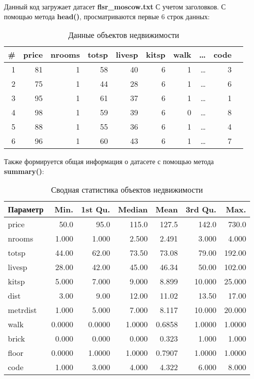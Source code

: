 Данный код загружает датасет \textbf{flsr\_moscow.txt} С учетом заголовков.
С помощью метода \textbf{head()}, просматриваются первые 6 строк данных:
\begin{table}
	\centering
	\caption{Данные объектов недвижимости}
	\begin{tabular}{@{}rrrrrrrrrr@{}}
		\toprule
		\# & price & nrooms & totsp & livesp & kitsp  & walk & \dots  & code \\ \midrule
		1  & 81    & 1      & 58    & 40     & 6            & 1    & \dots     & 3    \\
		2  & 75    & 1      & 44    & 28     & 6            & 1    & \dots     & 6    \\
		3  & 95    & 1      & 61    & 37     & 6            & 1    & \dots     &1    \\
		4  & 98    & 1      & 59    & 39     & 6           & 0    & \dots     & 8    \\
		5  & 88    & 1      & 55    & 36     & 6           & 1    & \dots     & 4    \\
		6  & 96    & 1      & 60    & 43     & 6           & 1    & \dots     & 7    \\ \bottomrule
	\end{tabular}
\end{table}

Также формируется общая информация о датасете с помощью метода \textbf{summary()}:
\begin{table}[h]
	\centering
	\caption{Сводная статистика объектов недвижимости}
	\begin{tabular}{@{}lrrrrrr@{}}
		\toprule
		Параметр & Min. & 1st Qu. & Median & Mean & 3rd Qu. & Max. \\ \midrule
		price       & 50.0   & 95.0     & 115.0  & 127.5  & 142.0   & 730.0  \\
		nrooms      & 1.000  & 1.000    & 2.500  & 2.491  & 3.000   & 4.000  \\
		totsp       & 44.00  & 62.00    & 73.50  & 73.08  & 79.00   & 192.00 \\
		livesp      & 28.00  & 42.00    & 45.00  & 46.34  & 50.00   & 102.00 \\
		kitsp       & 5.000  & 7.000    & 9.000  & 8.899  & 10.000  & 25.000 \\
		dist        & 3.00   & 9.00     & 12.00  & 11.02  & 13.50   & 17.00  \\
		metrdist    & 1.000  & 5.000    & 7.000  & 8.117  & 10.000  & 20.000 \\
		walk        & 0.0000 & 0.0000   & 1.0000 & 0.6858 & 1.0000  & 1.0000 \\
		brick       & 0.000  & 0.000    & 0.000  & 0.323  & 1.000   & 1.000  \\
		floor       & 0.0000 & 1.0000   & 1.0000 & 0.7907 & 1.0000  & 1.0000 \\
		code        & 1.000  & 3.000    & 4.000  & 4.322  & 6.000   & 8.000  \\ \bottomrule
	\end{tabular}
\end{table}

